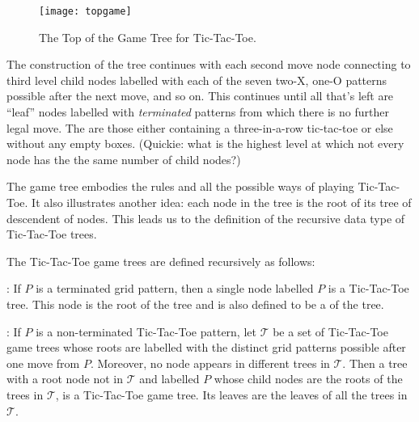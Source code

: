 \begin{figure}
\texttt{[image: topgame]}
\caption{The Top of the Game Tree for Tic-Tac-Toe.}
\label{fig:Tic-Tac-Toe}
\end{figure}

The construction of the tree continues with each second move node
connecting to third level child nodes labelled with each of the seven
two-X, one-O patterns possible after the next move, and so on.  This
continues until all that's left are ``leaf'' nodes labelled with
\emph{terminated} patterns from which there is no further legal move.
The  are those either containing a
three-in-a-row tic-tac-toe or else without any empty boxes.  (Quickie:
what is the highest level at which not every node has the the same
number of child nodes?)

The game tree embodies the rules and all the possible ways of playing
Tic-Tac-Toe.  It also illustrates another idea: each node in the tree
is the root of its tree of descendent of nodes.  This leads us to the
definition of the recursive data type of Tic-Tac-Toe trees.

\begin{definition}
The Tic-Tac-Toe game trees are defined recursively as follows:

: If $P$ is a terminated grid pattern, then a
single node labelled $P$ is a Tic-Tac-Toe tree.  This node is the root
of the tree and is also defined to be a  of the tree.

: If $P$ is a non-terminated
Tic-Tac-Toe pattern, let $\mathcal{T}$ be a set of Tic-Tac-Toe game
trees whose roots are labelled with the distinct grid patterns
possible after one move from $P$.  Moreover, no node appears in
different trees in $\mathcal{T}$.  Then a tree with a root node not in
$\mathcal{T}$ and labelled $P$ whose child nodes are the roots of the
trees in $\mathcal{T}$, is a Tic-Tac-Toe game tree.  Its leaves are
the leaves of all the trees in $\mathcal{T}$.

\end{definition}

